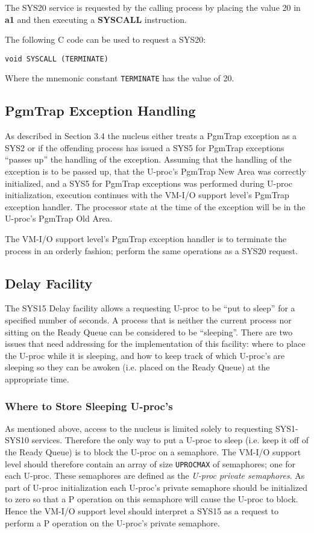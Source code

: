 The SYS20 service is requested by the calling process by placing the value 20 in \textbf{a1} and then executing a \textbf{SYSCALL} instruction.

The following C code can be used to request a SYS20:
\begin{center}
\verb+void SYSCALL (TERMINATE)+
\end{center}
Where the mnemonic constant \verb+TERMINATE+ has the value of 20.



\subsection{PgmTrap Exception Handling}
As described in Section 3.4 the nucleus either treats a PgmTrap exception as a SYS2 or if the offending process has issued a SYS5 for PgmTrap exceptions ``passes up'' the handling of the exception. 
Assuming that the handling of the exception is to be passed up, that the U-proc's PgmTrap New Area was correctly initialized, and a SYS5 for PgmTrap exceptions was performed during U-proc initialization, execution continues with the VM-I/O support level's PgmTrap exception handler. 
The processor state at the time of the exception will be in the U-proc's PgmTrap Old Area.

The VM-I/O support level's PgmTrap exception handler is to terminate the process in an orderly fashion; perform the same operations as a SYS20 request.



\subsection{Delay Facility}\label{ssec:delay}
The SYS15 Delay facility allows a requesting U-proc to be ``put to sleep'' for a specified number of seconds. 
A process that is neither the current process nor sitting on the Ready Queue can be considered to be ``sleeping''. 
There are two issues that need addressing for the implementation of this facility: where to place the U-proc while it is sleeping, and how to keep track of which U-proc's are sleeping so they can be awoken (i.e. placed on the Ready Queue) at the appropriate time.


\subsubsection{Where to Store Sleeping U-proc's}
As mentioned above, access to the nucleus is limited solely to requesting SYS1-SYS10 services. 
Therefore the only way to put a U-proc to sleep (i.e. keep it off of the Ready Queue) is to block the U-proc on a semaphore. 
The VM-I/O support level should therefore contain an array of size \verb+UPROCMAX+ of semaphores; one for
each U-proc.
These semaphores are defined as the \emph{U-proc private semaphores}. 
As part of U-proc initialization each U-proc's private semaphore should be initialized to zero so that a P operation on this semaphore will cause the U-proc to block.
Hence the VM-I/O support level should interpret a SYS15 as a request to perform a P operation on the U-proc's private semaphore.


